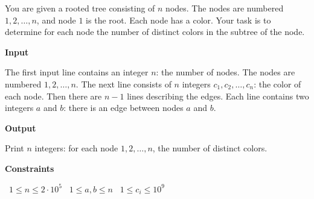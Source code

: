 You are given a rooted tree consisting of $n$ nodes. The nodes are numbered $1,2,\ldots,n$, and node $1$ is the root. Each node has a color.
Your task is to determine for each node the number of distinct colors in the subtree of the node.

\vspace{0.3cm}\noindent\textbf{Input}

The first input line contains an integer $n$: the number of nodes. The nodes are numbered $1,2,\ldots,n$.
The next line consists of $n$ integers $c_1,c_2,\ldots,c_n$: the color of each node.
Then there are $n-1$ lines describing the edges. Each line contains two integers $a$ and $b$: there is an edge between nodes $a$ and $b$.

\vspace{0.3cm}\noindent\textbf{Output}

Print $n$ integers: for each node $1,2,\ldots,n$, the number of distinct colors.

\vspace{0.3cm}\noindent\textbf{Constraints}

\textbullet\ $1 \le n \le 2 \cdot 10^5$
\textbullet\ $1 \le a,b \le n$
\textbullet\ $1 \le c_i \le 10^9$